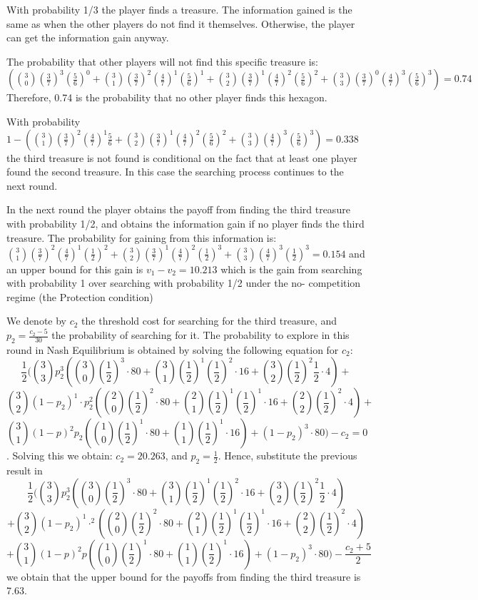 With probability 1/3 the player finds a treasure. The information gained is the same as when the other players do not find it themselves. Otherwise, the player can get the information gain anyway. 

The probability that other players will not find this specific treasure is: $(\binom{3}{0}(\frac{3}{7})^3(\frac{5}{6})^0+\binom{3}{1}(\frac{3}{7})^2(\frac{4}{7})^1(\frac{5}{6})^1+\binom{3}{2}(\frac{3}{7})^1(\frac{4}{7})^2(\frac{5}{6})^2+\binom{3}{3}(\frac{3}{7})^0(\frac{4}{7})^3(\frac{5}{6})^3)=0.74$\\
Therefore, 0.74 is the probability that no other player finds this hexagon.

With probability $1-(\binom{3}{1}(\frac{3}{7})^2(\frac{4}{7})^1\frac{5}{6}+\binom{3}{2}(\frac{3}{7})^1(\frac{4}{7})^2(\frac{5}{6})^2+\binom{3}{3}(\frac{4}{7})^3(\frac{5}{6})^3)=0.338$ the third treasure is not found is conditional on the fact that at least one player found the second treasure. In this case the searching process continues to the next round. 

In the next round the player obtains the payoff from finding the third treasure with probability 1/2, and obtains the information gain if no player finds the third treasure. The probability for gaining from this information is: $\binom{3}{1}(\frac{3}{7})^2(\frac{4}{7})^1(\frac{1}{2})^2+\binom{3}{2}(\frac{3}{7})^1(\frac{4}{7})^2(\frac{1}{2})^3+\binom{3}{3}(\frac{4}{7})^3(\frac{1}{2})^3=0.154$ and an upper bound for this gain is $v_1-v_2=10.213$ which is the gain from searching with probability 1 over searching with probability 1/2 under the  no- competition regime (the Protection condition) 

We denote by $c_2$ the threshold cost for searching for the third treasure, and $p_2 = \frac{c_2-5}{30}$ the probability of searching for it. The probability to explore in this round in Nash Equilibrium is obtained by solving the following equation for $c_2$: $$\frac{1}{2}(\binom{3}{3}p_2^3(\binom{3}{0}(\frac{1}{2})^3\cdot80+\binom{3}{1}(\frac{1}{2})^1(\frac{1}{2})^2\cdot16+\binom{3}{2}(\frac{1}{2})^2\frac{1}{2}\cdot4)+$$$$\binom{3}{2}(1-p_2)^1\cdot p_2^2(\binom{2}{0}(\frac{1}{2})^2\cdot80+\binom{2}{1}(\frac{1}{2})^1(\frac{1}{2})^1\cdot16+\binom{2}{2}(\frac{1}{2})^2\cdot4)+$$$$\binom{3}{1}(1-p)^2p_2(\binom{1}{0}(\frac{1}{2})^1\cdot80+\binom{1}{1}(\frac{1}{2})^1\cdot16)+(1-p_2)^3\cdot80)-c_2=0$$. Solving this we obtain: $c_2=20.263$, and $p_2 = \frac{1}{2}$.
Hence, substitute the previous result in $$\frac{1}{2}(\binom{3}{3}p_2^3(\binom{3}{0}(\frac{1}{2})^3\cdot80+\binom{3}{1}(\frac{1}{2})^1(\frac{1}{2})^2\cdot16+\binom{3}{2}(\frac{1}{2})^2\frac{1}{2}\cdot4)$$$$+\binom{3}{2}(1-p_2)^1\cdotp^2(\binom{2}{0}(\frac{1}{2})^2\cdot80+\binom{2}{1}(\frac{1}{2})^1(\frac{1}{2})^1\cdot16+\binom{2}{2}(\frac{1}{2})^2\cdot4)$$$$+\binom{3}{1}(1-p)^2p(\binom{1}{0}(\frac{1}{2})^1\cdot80+\binom{1}{1}(\frac{1}{2})^1\cdot16)+(1-p_2)^3\cdot80)-\frac{c_2+5}{2}$$ we obtain that the upper bound for the payoffs from finding the third treasure is 7.63.

